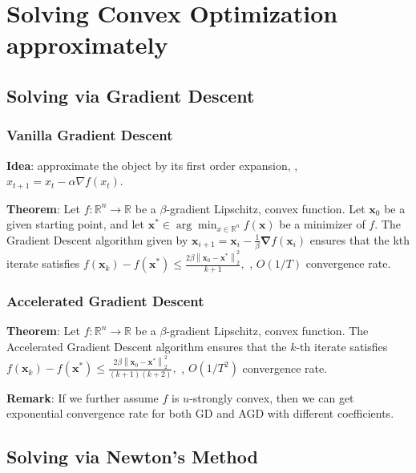 \section{Solving Convex Optimization approximately}

\subsection{Solving via Gradient Descent}

\subsubsection{Vanilla Gradient Descent}

\textbf{Idea}: approximate the object by its first order expansion, \ie, $x_{t+1} = x_t - \alpha \nabla f(x_t)$.

\textbf{Theorem}: Let $f: \mathbb{R}^{n} \rightarrow \mathbb{R}$ be a $\beta$-gradient Lipschitz, convex function. Let $\boldsymbol{x}_{0}$ be a given starting point, and let $\boldsymbol{x}^{*} \in \arg \min _{x \in \mathbb{R}^{n}} f(\boldsymbol{x})$ be a minimizer of $f$. The Gradient Descent algorithm given by
$
\boldsymbol{x}_{i+1}=\boldsymbol{x}_{i}-\frac{1}{\beta} \boldsymbol{\nabla} f\left(\boldsymbol{x}_{i}\right)
$
ensures that the kth iterate satisfies
$
f\left(\boldsymbol{x}_{k}\right)-f\left(\boldsymbol{x}^{*}\right) \leq \frac{2 \beta\left\|\boldsymbol{x}_{0}-\boldsymbol{x}^{*}\right\|_{2}^{2}}{k+1},
$ \ie, $O(1/T)$ convergence rate.

\subsubsection{Accelerated Gradient Descent}
\textbf{Theorem}: Let $f: \mathbb{R}^{n} \rightarrow \mathbb{R}$ be a $\beta$-gradient Lipschitz, convex function. 
The Accelerated Gradient Descent algorithm 
ensures that the $k$-th iterate satisfies
$
f\left(\boldsymbol{x}_{k}\right)-f\left(\boldsymbol{x}^{*}\right) \leq \frac{2 \beta\left\|\boldsymbol{x}_{0}-\boldsymbol{x}^{*}\right\|_{2}^{2}}{(k+1)(k+2)},
$ \ie, $O(1/T^2)$ convergence rate.


\textbf{Remark}: If we further assume $f$ is $u$-strongly convex, then we can get exponential convergence rate for both GD and AGD with different coefficients.


\subsection{Solving via Newton's Method}


